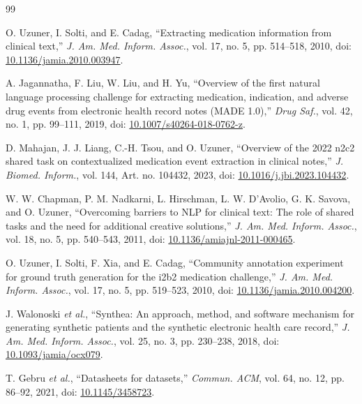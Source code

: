 \documentclass[conference]{IEEEtran}
\begin{document}
\begin{thebibliography}{99}

O. Uzuner, I. Solti, and E. Cadag, ``Extracting medication information from
clinical text,'' \emph{J. Am. Med. Inform. Assoc.}, vol. 17, no. 5,
pp. 514--518, 2010, doi: \href{https://doi.org/10.1136/jamia.2010.003947}{10.1136/jamia.2010.003947}.

A. Jagannatha, F. Liu, W. Liu, and H. Yu, ``Overview of the first natural
language processing challenge for extracting medication, indication, and
adverse drug events from electronic health record notes (MADE 1.0),''
\emph{Drug Saf.}, vol. 42, no. 1, pp. 99--111, 2019, doi:
\href{https://doi.org/10.1007/s40264-018-0762-z}{10.1007/s40264-018-0762-z}.

D. Mahajan, J. J. Liang, C.-H. Tsou, and O. Uzuner, ``Overview of the 2022
n2c2 shared task on contextualized medication event extraction in clinical
notes,'' \emph{J. Biomed. Inform.}, vol. 144, Art. no. 104432, 2023, doi:
\href{https://doi.org/10.1016/j.jbi.2023.104432}{10.1016/j.jbi.2023.104432}.

W. W. Chapman, P. M. Nadkarni, L. Hirschman, L. W. D'Avolio, G. K. Savova,
and O. Uzuner, ``Overcoming barriers to NLP for clinical text: The role of
shared tasks and the need for additional creative solutions,'' \emph{J. Am.
Med. Inform. Assoc.}, vol. 18, no. 5, pp. 540--543, 2011, doi:
\href{https://doi.org/10.1136/amiajnl-2011-000465}{10.1136/amiajnl-2011-000465}.

O. Uzuner, I. Solti, F. Xia, and E. Cadag, ``Community annotation experiment
for ground truth generation for the i2b2 medication challenge,'' \emph{J. Am.
Med. Inform. Assoc.}, vol. 17, no. 5, pp. 519--523, 2010, doi:
\href{https://doi.org/10.1136/jamia.2010.004200}{10.1136/jamia.2010.004200}.

J. Walonoski \emph{et al.}, ``Synthea: An approach, method, and software
mechanism for generating synthetic patients and the synthetic electronic
health care record,'' \emph{J. Am. Med. Inform. Assoc.}, vol. 25, no. 3,
pp. 230--238, 2018, doi:
\href{https://doi.org/10.1093/jamia/ocx079}{10.1093/jamia/ocx079}.

T. Gebru \emph{et al.}, ``Datasheets for datasets,'' \emph{Commun. ACM},
vol. 64, no. 12, pp. 86--92, 2021, doi:
\href{https://doi.org/10.1145/3458723}{10.1145/3458723}.


\end{thebibliography}
\end{document}

